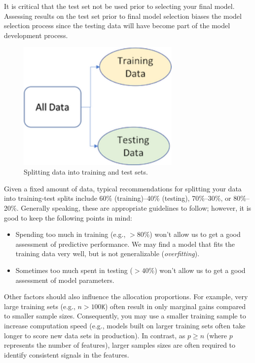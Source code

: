 \documentclass[]{krantz}
\makeatletter
\providecommand{\tightlist}{%
  \setlength{\itemsep}{0pt}\setlength{\parskip}{0pt}}
\newenvironment{kframe}{%
\medskip{}
\setlength{\fboxsep}{.8em}
 \def\at@end@of@kframe{}%
 \ifinner\ifhmode%
  \def\at@end@of@kframe{\end{minipage}}%
  \begin{minipage}{\columnwidth}%
 \fi\fi%
 \def\FrameCommand##1{\hskip\@totalleftmargin \hskip-\fboxsep
 \colorbox{shadecolor}{##1}\hskip-\fboxsep
     \hskip-\linewidth \hskip-\@totalleftmargin \hskip\columnwidth}%
 \MakeFramed {\advance\hsize-\width
   \@totalleftmargin\z@ \linewidth\hsize
   \@setminipage}}%
 {\par\unskip\endMakeFramed%
 \at@end@of@kframe}
\newenvironment{block}[1]
  {
  \begin{itemize}
  \renewcommand{\labelitemi}{
    \raisebox{-.7\height}[0pt][0pt]{
      {\setkeys{Gin}{width=3em,keepaspectratio}\texttt{[image: icons/\#1]}}
    }
  }
  \setlength{\fboxsep}{1em}
  \begin{kframe}
  \item
  }
  {
  \end{kframe}
  \end{itemize}
  }
\newenvironment{warning}
  {\begin{block}{warning}}
  {\end{block}}
\makeatother
\begin{document}
\begin{warning}
It is critical that the test set not be used prior to selecting your
final model. Assessing results on the test set prior to final model
selection biases the model selection process since the testing data will
have become part of the model development process.
\end{warning}

\begin{figure}

{\centering \includegraphics[width=3.12in]{images/data_split} 

}

\caption{Splitting data into training and test sets.}\label{fig:02-split}
\end{figure}

Given a fixed amount of data, typical recommendations for splitting your data into training-test splits include 60\% (training)--40\% (testing), 70\%--30\%, or 80\%--20\%. Generally speaking, these are appropriate guidelines to follow; however, it is good to keep the following points in mind:

\begin{itemize}
\tightlist
\item
  Spending too much in training (e.g., \(>80\%\)) won't allow us to get a good assessment of predictive performance. We may find a model that fits the training data very well, but is not generalizable (\emph{overfitting}).
\item
  Sometimes too much spent in testing (\(>40\%\)) won't allow us to get a good assessment of model parameters.
\end{itemize}

Other factors should also influence the allocation proportions. For example, very large training sets (e.g., \(n > 100\texttt{K}\)) often result in only marginal gains compared to smaller sample sizes. Consequently, you may use a smaller training sample to increase computation speed (e.g., models built on larger training sets often take longer to score new data sets in production). In contrast, as \(p \geq n\) (where \(p\) represents the number of features), larger samples sizes are often required to identify consistent signals in the features.
\end{document}
